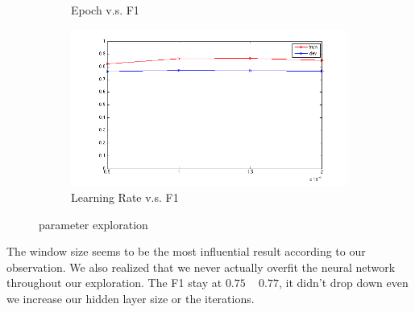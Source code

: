 \documentclass[letterpaper]{article}
\begin{document}
\begin{figure}[ht]
\begin{subfigure}{.5\textwidth}
  \caption{Epoch v.s. F1}
  \label{fig:epoch}
\end{subfigure}%
\begin{subfigure}{.5\textwidth}
  \includegraphics[scale=0.5, width=1.0\linewidth]{alpha.png}
  \caption{Learning Rate v.s. F1}
  \label{fig:alpha}
\end{subfigure}
\caption{parameter exploration}
\label{fig:exploration}
\end{figure}
The window size seems to be the most influential result according to our observation. We also realized that we never actually overfit the neural network throughout our exploration. The F1 stay at $0.75$ ~ $0.77$, it didn't drop down even we increase our hidden layer size or the iterations. 
\end{document}
